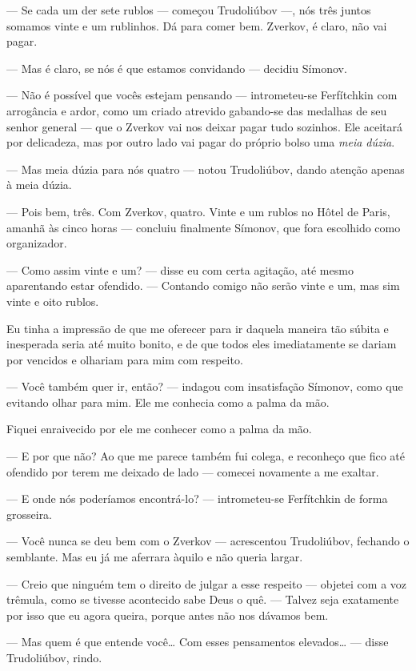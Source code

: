 --- Se cada um der sete rublos --- começou Trudoliúbov ---, nós três juntos
somamos vinte e um rublinhos. Dá para comer bem. Zverkov, é claro, não
vai pagar.

--- Mas é claro, se nós é que estamos convidando --- decidiu Símonov.

--- Não é possível que vocês estejam pensando --- intrometeu-se Ferfítchkin
com arrogância e ardor, como um criado atrevido gabando-se das medalhas
de seu senhor general --- que o Zverkov vai nos deixar pagar tudo
sozinhos. Ele aceitará por delicadeza, mas por outro lado vai pagar do
próprio bolso uma \textit{meia dúzia}.

--- Mas meia dúzia para nós quatro --- notou Trudoliúbov, dando atenção
apenas à meia dúzia.

--- Pois bem, três. Com Zverkov, quatro. Vinte e um rublos no
Hôtel de Paris, amanhã às cinco horas --- concluiu
finalmente Símonov, que fora escolhido como organizador.

--- Como assim vinte e um? --- disse eu com certa agitação, até mesmo
aparentando estar ofendido. --- Contando comigo não serão vinte e um, mas
sim vinte e oito rublos.


Eu tinha a impressão de que me oferecer para ir daquela maneira tão
súbita e inesperada seria até muito bonito, e de que todos eles
imediatamente se dariam por vencidos e olhariam para mim com respeito.

--- Você também quer ir, então? --- indagou com insatisfação Símonov, como
que evitando olhar para mim. Ele me conhecia como a palma da mão.

Fiquei enraivecido por ele me conhecer como a palma da mão.

--- E por que não? Ao que me parece também fui colega, e reconheço que
fico até ofendido por terem me deixado de lado --- comecei novamente a
me exaltar.

--- E onde nós poderíamos encontrá-lo? --- intrometeu-se Ferfítchkin de
forma grosseira.

--- Você nunca se deu bem com o Zverkov --- acrescentou Trudoliúbov,
fechando o semblante. Mas eu já me aferrara àquilo e não queria largar.

--- Creio que ninguém tem o direito de julgar a esse respeito --- objetei
com a voz trêmula, como se tivesse acontecido sabe Deus o quê. --- Talvez
seja exatamente por isso que eu agora queira, porque antes não nos
dávamos bem.

--- Mas quem é que entende você\ldots{} Com esses pensamentos elevados\ldots{} ---
disse Trudoliúbov, rindo.

